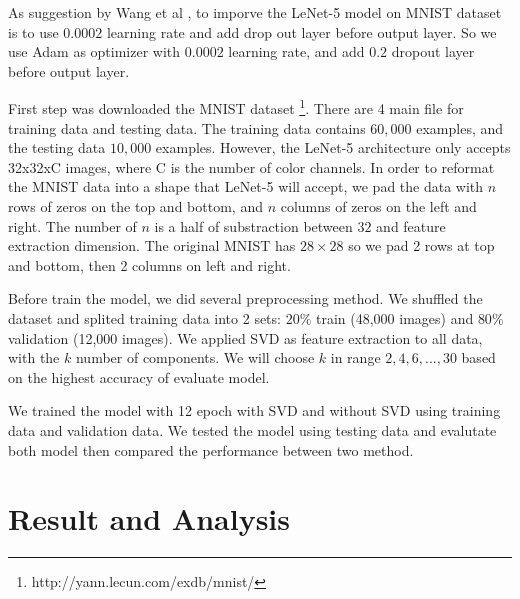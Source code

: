 \documentclass[conference]{IEEEtran}
\begin{document}
As suggestion by Wang et al \cite{wang2020improvement}, to imporve the LeNet-5 model on MNIST dataset is to use $0.0002$ learning rate and add drop out layer before output layer.
So we use Adam as optimizer with $0.0002$ learning rate, and add $0.2$ dropout layer before output layer.

First step was downloaded the MNIST dataset \footnote{http://yann.lecun.com/exdb/mnist/}. There are 4 main file for training data and testing data.
The training data contains $60,000$ examples, and the testing data $10,000$ examples.
However, the LeNet-5 architecture only accepts 32x32xC images, where C is the number of color channels. 
In order to reformat the MNIST data into a shape that LeNet-5 will accept, we pad the data with $n$ rows of zeros on the top and bottom, and $n$ columns of zeros on the left and right. 
The number of $n$ is a half of substraction between $32$ and feature extraction dimension. The original MNIST has $28 \times 28$ so we pad 2 rows at top and bottom, then 2 columns on left and right.

Before train the model, we did several preprocessing method. We shuffled the dataset and splited training data into 2 sets: $20 \%$ train (48,000 images) and $80 \%$ validation (12,000 images).
We applied SVD as feature extraction to all data, with the $k$ number of components. We will choose $k$ in range $2, 4, 6, ..., 30$ based on the highest accuracy of evaluate model.

We trained the model with 12 epoch with SVD and without SVD using training data and validation data. We tested the model using testing data and evalutate both model then compared the performance between two method.
\section{Result and Analysis}
\end{document}
